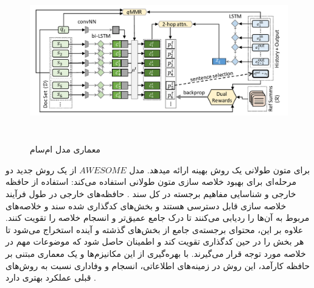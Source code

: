 \begin{figure}[!h]
	\begin{center}
		\includegraphics[height=7cm]{query-assited.png}
	\end{center}
	\caption{ معماری مدل ام‌سام \cite{shapira-etal-2022-interactive}} 
	\label{fig:MSumm}
	
	\medskip
	
\end{figure}








برای متون طولانی یک روش بهینه ارائه میدهد.
مدل $ AWESOME $ از یک روش جدید دو مرحله‌ای برای بهبود خلاصه سازی متون طولانی استفاده می‌کند: استفاده از حافظه خارجی و شناسایی مفاهیم برجسته در کل سند
. حافظه‌های خارجی در طول فرآیند خلاصه سازی قابل دسترسی هستند و بخش‌های کدگذاری شده سند و خلاصه‌های مربوط به آن‌ها را ردیابی می‌کنند تا درک جامع عمیق‌تر و انسجام خلاصه را تقویت کنند. علاوه بر این، محتوای برجسته‌ی جامع از بخش‌های گذشته و آینده استخراج می‌شود تا هر بخش را در حین کدگذاری تقویت کند و اطمینان حاصل شود که موضوعات مهم در خلاصه مورد توجه قرار می‌گیرند. با بهره‌گیری از این مکانیزم‌ها و یک معماری مبتنی بر حافظه کارآمد، این روش در زمینه‌های اطلاعاتی، انسجام و وفاداری نسبت به روش‌های قبلی عملکرد بهتری دارد
\cite{Cao2023AWESOMEGM}.
